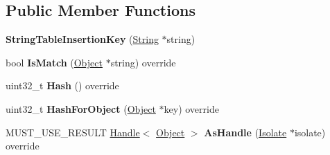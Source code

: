 \subsection*{Public Member Functions}
\begin{DoxyCompactItemize}
\item 
{\bfseries String\+Table\+Insertion\+Key} (\hyperlink{classv8_1_1internal_1_1_string}{String} $\ast$string)\hypertarget{classv8_1_1internal_1_1_string_table_insertion_key_abaea315ebc0408ec7e2c136502688c14}{}\label{classv8_1_1internal_1_1_string_table_insertion_key_abaea315ebc0408ec7e2c136502688c14}

\item 
bool {\bfseries Is\+Match} (\hyperlink{classv8_1_1internal_1_1_object}{Object} $\ast$string) override\hypertarget{classv8_1_1internal_1_1_string_table_insertion_key_abebd8e6ff32c34730fbf05046da35824}{}\label{classv8_1_1internal_1_1_string_table_insertion_key_abebd8e6ff32c34730fbf05046da35824}

\item 
uint32\+\_\+t {\bfseries Hash} () override\hypertarget{classv8_1_1internal_1_1_string_table_insertion_key_a9242b53c9e3dc5d77b17891664217dc4}{}\label{classv8_1_1internal_1_1_string_table_insertion_key_a9242b53c9e3dc5d77b17891664217dc4}

\item 
uint32\+\_\+t {\bfseries Hash\+For\+Object} (\hyperlink{classv8_1_1internal_1_1_object}{Object} $\ast$key) override\hypertarget{classv8_1_1internal_1_1_string_table_insertion_key_ad00a9c7e9aabfc88095e555a0e1b3a14}{}\label{classv8_1_1internal_1_1_string_table_insertion_key_ad00a9c7e9aabfc88095e555a0e1b3a14}

\item 
M\+U\+S\+T\+\_\+\+U\+S\+E\+\_\+\+R\+E\+S\+U\+LT \hyperlink{classv8_1_1internal_1_1_handle}{Handle}$<$ \hyperlink{classv8_1_1internal_1_1_object}{Object} $>$ {\bfseries As\+Handle} (\hyperlink{classv8_1_1internal_1_1_isolate}{Isolate} $\ast$isolate) override\hypertarget{classv8_1_1internal_1_1_string_table_insertion_key_a6e6b34e508a20f540382be42c7df715e}{}\label{classv8_1_1internal_1_1_string_table_insertion_key_a6e6b34e508a20f540382be42c7df715e}

\end{DoxyCompactItemize}
